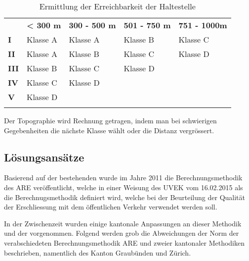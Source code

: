 \begin{longtable}[c]{l p{3.3cm} p{3.3cm} p{3.3cm} p{3.3cm}}
        \midrule
        \textbf{}
                                & \textbf{< 300 m}
                                & \textbf{300 - 500 m}
                                & \textbf{501 - 750 m}
                                & \textbf{751 - 1000m}\\
        \textbf{I}
                                & Klasse A
                                & Klasse A
                                & Klasse B
                                & Klasse C\\
        \textbf{II}
                                & Klasse A
                                & Klasse B
                                & Klasse C
                                & Klasse D\\
        \textbf{III}
                                & Klasse B
                                & Klasse C
                                & Klasse D
                                &\\
        \textbf{IV}
                                & Klasse C
                                & Klasse D
                                &
                                &\\
        \textbf{V}
                                & Klasse D
                                &
                                &
                                &\\
        \bottomrule
    \caption{Ermittlung der Erreichbarkeit der Haltestelle}
    \label{table:Ermittlung Erreichbarkeit der Haltestelle}
\end{longtable}

Der Topographie wird Rechnung getragen, indem man bei schwierigen Gegebenheiten die nächste Klasse wählt oder die Distanz vergrössert.

\subsection{Lösungsansätze}
\label{Stand der Technik:Lösungsansätze}
Basierend auf der bestehenden  wurde im Jahre 2011 die Berechnungsmethodik des \ac{ARE} veröffentlicht, welche in einer Weisung des \acs{UVEK} vom 16.02.2015 als die Berechnugsmethodik definiert wird, welche bei der Beurteilung der Qualität der Erschliessung mit dem öffentlichen Verkehr verwendet werden soll.

In der Zwischenzeit wurden einige kantonale Anpassungen an dieser Methodik und der  vorgenommen.
Folgend werden grob die Abweichungen der Norm der verabschiedeten Berechnungsmethodik ARE und zweier kantonaler Methodiken beschrieben, namentlich des Kanton Graubünden und Zürich.

